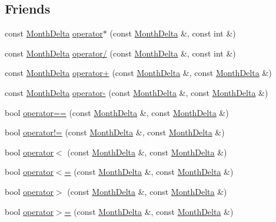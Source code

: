 \subsection*{\-Friends}
\begin{DoxyCompactItemize}
\item 
const \hyperlink{structMonthDelta}{\-Month\-Delta} \hyperlink{structMonthDelta_a766914d0071f3b05bb8207fb43ed8a7f}{operator$\ast$} (const \hyperlink{structMonthDelta}{\-Month\-Delta} \&, const int \&)
\item 
const \hyperlink{structMonthDelta}{\-Month\-Delta} \hyperlink{structMonthDelta_a1dda088a057b9b834a81182b177811a3}{operator/} (const \hyperlink{structMonthDelta}{\-Month\-Delta} \&, const int \&)
\item 
const \hyperlink{structMonthDelta}{\-Month\-Delta} \hyperlink{structMonthDelta_adf6400ab47cfda30bcf0e52c489dcd65}{operator+} (const \hyperlink{structMonthDelta}{\-Month\-Delta} \&, const \hyperlink{structMonthDelta}{\-Month\-Delta} \&)
\item 
const \hyperlink{structMonthDelta}{\-Month\-Delta} \hyperlink{structMonthDelta_a22a21f373298f477cfd559740b9e5e4d}{operator-\/} (const \hyperlink{structMonthDelta}{\-Month\-Delta} \&, const \hyperlink{structMonthDelta}{\-Month\-Delta} \&)
\item 
bool \hyperlink{structMonthDelta_aa0803460a688c23c8e65d9fa9b543001}{operator==} (const \hyperlink{structMonthDelta}{\-Month\-Delta} \&, const \hyperlink{structMonthDelta}{\-Month\-Delta} \&)
\item 
bool \hyperlink{structMonthDelta_a18026b840e36147e3568f3a4a054e047}{operator!=} (const \hyperlink{structMonthDelta}{\-Month\-Delta} \&, const \hyperlink{structMonthDelta}{\-Month\-Delta} \&)
\item 
bool \hyperlink{structMonthDelta_a67951bca9aab80b5d53a38d6332ff38a}{operator$<$} (const \hyperlink{structMonthDelta}{\-Month\-Delta} \&, const \hyperlink{structMonthDelta}{\-Month\-Delta} \&)
\item 
bool \hyperlink{structMonthDelta_a56be34fa0a6a432cebfacc21acecaf88}{operator$<$=} (const \hyperlink{structMonthDelta}{\-Month\-Delta} \&, const \hyperlink{structMonthDelta}{\-Month\-Delta} \&)
\item 
bool \hyperlink{structMonthDelta_a583a0205709b2d14afb855f8656c783c}{operator$>$} (const \hyperlink{structMonthDelta}{\-Month\-Delta} \&, const \hyperlink{structMonthDelta}{\-Month\-Delta} \&)
\item 
bool \hyperlink{structMonthDelta_a6ffa4372b018021cc399ff18b0e26774}{operator$>$=} (const \hyperlink{structMonthDelta}{\-Month\-Delta} \&, const \hyperlink{structMonthDelta}{\-Month\-Delta} \&)
\end{DoxyCompactItemize}


